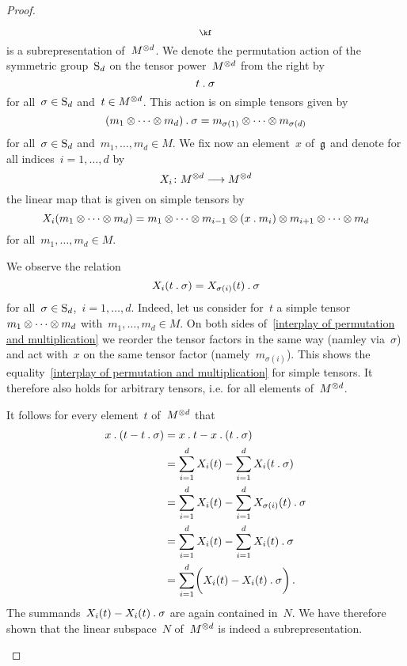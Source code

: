 \begin{proof}
\begin{enumerate}
\[{				}_{\kf}
			\]
			is a subrepresentation of~$M^{\otimes d}$.
			We denote the permutation action of the symmetric group~$\operatorname{S}_d$ on the tensor power~$M^{\otimes d}$ from the right by
			\[
				t \mathbin{.} \sigma
			\]
			for all~$\sigma \in \operatorname{S}_d$ and~$t \in M^{\otimes d}$.
			This action is on simple tensors given by
			\[
				(m_1 \otimes \dotsb \otimes m_d) \mathbin{.} \sigma
				=
				m_{\sigma(1)} \otimes \dotsb \otimes m_{\sigma(d)}
			\]
			for all~$\sigma \in \operatorname{S}_d$ and~$m_1, \dotsc, m_d \in M$.
			We fix now an element~$x$ of~$\mathfrak{g}$ and denote for all indices~$i = 1, \dotsc, d$ by
			\[
				X_i
				\colon
				M^{\tensor d}
				\to
				M^{\tensor d}
			\]
			the linear map that is given on simple tensors by
			\[
				X_i(m_1 \otimes \dotsb \otimes m_d)
				=
				m_1 \otimes \dotsb \otimes m_{i-1}
				\otimes (x \mathbin{.} m_i)
				\otimes m_{i+1} \otimes \dotsb \otimes m_d
			\]
			for all~$m_1, \dotsc, m_d \in M$.
			
			We observe the relation
			\begin{equation}
				\label{interplay of permutation and multiplication}
				X_i( t \mathbin{.} \sigma )
				=
				X_{\sigma(i)}(t) \mathbin{.} \sigma
			\end{equation}
			for all~$\sigma \in \operatorname{S}_d$,~$i = 1, \dotsc, d$.
			Indeed, let us consider for~$t$ a simple tensor~$m_1 \otimes \dotsb \otimes m_d$ with~$m_1, \dotsc, m_d \in M$.
			On both sides of~\eqref{interplay of permutation and multiplication} we reorder the tensor factors in the same way (namley via~$\sigma$) and act with~$x$ on the same tensor factor (namely~$m_{\sigma(i)}$).
			This shows the equality~\eqref{interplay of permutation and multiplication} for simple tensors.
			It therefore also holds for arbitrary tensors, i.e. for all elements of~$M^{\otimes d}$.
			
			It follows for every element~$t$ of~$M^{\otimes d}$ that
			\begin{align*}
				x \mathbin{.} ( t - t \mathbin{.} \sigma )
				&=
				x \mathbin{.} t - x \mathbin{.} (t \mathbin{.} \sigma)
				\\
				&=
				\sum_{i=1}^d X_i(t) - \sum_{i=1}^d X_i(t \mathbin{.} \sigma)
				\\
				&=
				\sum_{i=1}^d X_i(t) - \sum_{i=1}^d X_{\sigma(i)}(t) \mathbin{.} \sigma
				\\
				&=
				\sum_{i=1}^d X_i(t) - \sum_{i=1}^d X_i(t) \mathbin{.} \sigma
				\\
				&=
				\sum_{i=1}^d \biggl( X_i(t) - X_i(t) \mathbin{.} \sigma \biggr) \,.
			\end{align*}
			The summands~$X_i(t) - X_i(t) \mathbin{.} \sigma$ are again contained in~$N$.
			We have therefore shown that the linear subspace~$N$ of~$M^{\otimes d}$ is indeed a subrepresentation.
		\qedhere
	\end{enumerate}
\end{proof}






